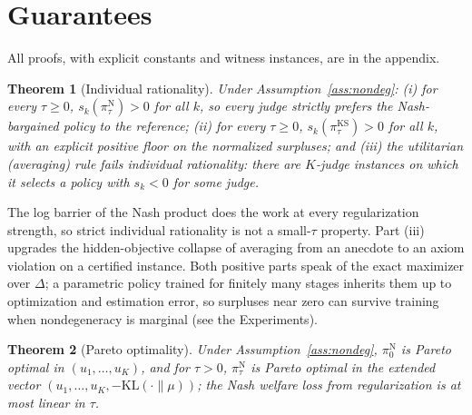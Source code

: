 \documentclass[letterpaper]{article} %
\newtheorem{theorem}{Theorem}
\newcommand{\KL}{\mathrm{KL}}
\begin{document}
\section{Guarantees}
\label{sec:guarantees}
All proofs, with explicit constants and witness instances, are in the appendix.
\begin{theorem}[Individual rationality]
\label{thm:ir}
Under Assumption~\ref{ass:nondeg}: (i) for every $\tau\ge0$, $s_k(\pi^{\mathrm N}_\tau)>0$ for all $k$, so every judge strictly prefers the Nash-bargained policy to the reference; (ii) for every $\tau\ge0$, $s_k(\pi^{\mathrm{KS}}_\tau)>0$ for all $k$, with an explicit positive floor on the normalized surpluses; and (iii) the utilitarian (averaging) rule fails individual rationality: there are $K$-judge instances on which it selects a policy with $s_k<0$ for some judge.
\end{theorem}
The log barrier of the Nash product does the work at every regularization strength, so strict individual rationality is not a small-$\tau$ property. Part (iii) upgrades the hidden-objective collapse of averaging from an anecdote to an axiom violation on a certified instance. Both positive parts speak of the exact maximizer over $\Delta$; a parametric policy trained for finitely many stages inherits them up to optimization and estimation error, so surpluses near zero can survive training when nondegeneracy is marginal (see the Experiments).

\begin{theorem}[Pareto optimality]
\label{thm:po}
Under Assumption~\ref{ass:nondeg}, $\pi^{\mathrm N}_0$ is Pareto optimal in $(u_1,\dots,u_K)$, and for $\tau>0$, $\pi^{\mathrm N}_\tau$ is Pareto optimal in the extended vector $(u_1,\dots,u_K,-\KL(\cdot\|\mu))$; the Nash welfare loss from regularization is at most linear in $\tau$.
\end{theorem}
\end{document}
